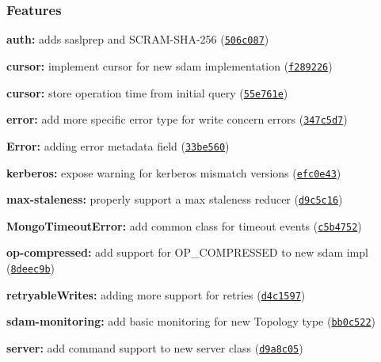 \subsubsection*{Features}


\begin{DoxyItemize}
\item {\bfseries auth\+:} adds saslprep and S\+C\+R\+A\+M-\/\+S\+H\+A-\/256 (\href{https://github.com/mongodb-js/mongodb-core/commit/506c087}{\tt 506c087})
\item {\bfseries cursor\+:} implement cursor for new sdam implementation (\href{https://github.com/mongodb-js/mongodb-core/commit/f289226}{\tt f289226})
\item {\bfseries cursor\+:} store operation time from initial query (\href{https://github.com/mongodb-js/mongodb-core/commit/55e761e}{\tt 55e761e})
\item {\bfseries error\+:} add more specific error type for write concern errors (\href{https://github.com/mongodb-js/mongodb-core/commit/347c5d7}{\tt 347c5d7})
\item {\bfseries Error\+:} adding error metadata field (\href{https://github.com/mongodb-js/mongodb-core/commit/33be560}{\tt 33be560})
\item {\bfseries kerberos\+:} expose warning for kerberos mismatch versions (\href{https://github.com/mongodb-js/mongodb-core/commit/efc0e43}{\tt efc0e43})
\item {\bfseries max-\/staleness\+:} properly support a max staleness reducer (\href{https://github.com/mongodb-js/mongodb-core/commit/d9c5c16}{\tt d9c5c16})
\item {\bfseries Mongo\+Timeout\+Error\+:} add common class for timeout events (\href{https://github.com/mongodb-js/mongodb-core/commit/c5b4752}{\tt c5b4752})
\item {\bfseries op-\/compressed\+:} add support for O\+P\+\_\+\+C\+O\+M\+P\+R\+E\+S\+S\+ED to new sdam impl (\href{https://github.com/mongodb-js/mongodb-core/commit/8deec9b}{\tt 8deec9b})
\item {\bfseries retryable\+Writes\+:} adding more support for retries (\href{https://github.com/mongodb-js/mongodb-core/commit/d4c1597}{\tt d4c1597})
\item {\bfseries sdam-\/monitoring\+:} add basic monitoring for new Topology type (\href{https://github.com/mongodb-js/mongodb-core/commit/bb0c522}{\tt bb0c522})
\item {\bfseries server\+:} add {\ttfamily command} support to new server class (\href{https://github.com/mongodb-js/mongodb-core/commit/d9a8c05}{\tt d9a8c05})

\end{DoxyItemize}
